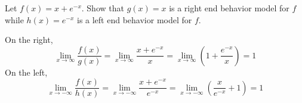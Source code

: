 \begin{example}{Let $f(x)=x+e^{-x}$. Show that $g(x)=x$ is a right end behavior model for $f$ while $h(x)=e^{-x}$ is a left end behavior model for $f$.}
    
    On the right, \[
        \lim_{x \to \infty} \frac{f(x)}{g(x)} = \lim_{x \to \infty} \frac{x+e^{-x}}{x} = \lim_{x \to \infty} \left( 1+\frac{e^{-x}}{x} \right) = 1
    \] On the left, \[
        \lim_{x \to -\infty} \frac{f(x)}{h(x)} = \lim_{x \to -\infty} \frac{x+e^{-x}}{e^{-x}} = \lim_{x \to -\infty} \left( \frac{x}{e^{-x}}+1 \right) = 1
    \]
\end{example}
